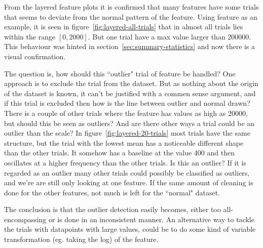 From the layered feature plots it is confirmed that many features have some trials that seems to deviate from the normal pattern of the feature. Using feature  as an example, it is seen in figure~\ref{fig:layered-all-trials} that  in almost all trials lies within the range $[0,2000]$. But one trial have a max value larger than 200000. This behaviour was hinted in section~\ref{sec:summary-statistics} and now there is a visual confirmation. \par
The question is, how should this ``outlier" trial of feature  be handled? One approach is to exclude the trial from the dataset. But as nothing about the origin of the dataset is known, it can't be justified with a commen sense argument, and if this trial is excluded then how is the line between outlier and normal drawn? There is a couple of other trials where the  feature has values as high as 20000, but should this be seen as outliers? And are there other ways a trial could be an outlier than the scale? In figure~\ref{fig:layered-20-trials} most trials have the same structure, but the trial with the lowest mean has a noticeable different shape than the other trials. It somehow has a baseline at the value 400 and then oscillates at a higher frequency than the other trials. Is this an outlier? If it is regarded as an outlier many other trials could possibly be classified as outliers, and we're are still only looking at one feature. If the same amount of cleaning is done for the other features, not much is left for the ``normal" dataset. \par
The conclusion is that the outlier detection easily becomes, either too all-encompassing or is done in an inconsistent manner. An alternative way to tackle the trials with datapoints with large values, could be to do some kind of variable transformation (eg. taking the log) of the feature.

